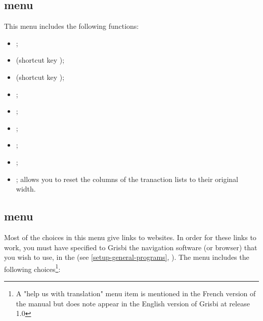 \subsection{ menu\label{home-menus-display}}

This menu includes the following functions: 

\begin{itemize}
	 \item {}; 
	 \item {} (shortcut key );
	 \item {} (shortcut key );
	 \item {};
	 \item {};
	 \item {};
	 \item {};
	 \item {};
	 \item {}; allows you to reset the columns of the tranaction lists to their original width.
\end{itemize}


\subsection{ menu\label{home-menus-help}}

Most of the choices in this menu give links to websites. In order for these links to work, you must have specified to Grisbi the navigation software (or browser) that you wish to use, in the  (see \vref{setup-general-programs}, ). The  menu includes the following choices\footnote{ A "help us with translation" menu item is mentioned in the French version of the manual but does note appear in the English version of Grisbi at release 1.0}:

